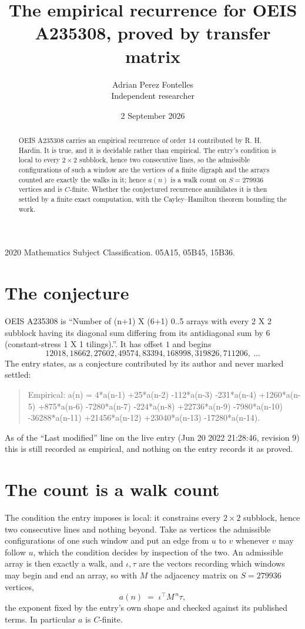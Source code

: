 \documentclass[11pt,a4paper]{article}
\title{The empirical recurrence for OEIS A235308, proved by transfer matrix}
\author{Adrian Perez Fontelles\\ \small Independent researcher}
\date{2 September 2026}
\theoremstyle{plain}
\theoremstyle{definition}
\begin{document}
\maketitle

\begin{abstract}
OEIS A235308 carries an empirical recurrence of order $14$ contributed by R. H. Hardin. It is
true, and it is decidable rather than empirical. The entry's condition is local to every $2\times2$ subblock, hence two consecutive lines, so
the admissible configurations of such a window are the vertices of a finite digraph and the
arrays counted are exactly the walks in it; hence $a(n)$ is a walk count on $S=279936$ vertices
and is $C$-finite. Whether the conjectured recurrence annihilates it is then settled by a
finite exact computation, with the Cayley--Hamilton theorem bounding the work.
\end{abstract}

\noindent\small 2020 Mathematics Subject Classification. 05A15, 05B45, 15B36.\normalsize

\section{The conjecture}

OEIS A235308 is ``Number of (n+1) X (6+1) 0..5 arrays with every 2 X 2 subblock having its diagonal sum differing from its antidiagonal sum by 6 (constant-stress 1 X 1 tilings).''. It has offset $1$ and begins
\[
12018, 18662, 27602, 49574, 83394, 168998, 319826, 711206,\ \dots
\]
The entry states, as a conjecture contributed by its author and never marked settled:
\begin{quote}
Empirical: a(n) = 4*a(n-1) +25*a(n-2) -112*a(n-3) -231*a(n-4) +1260*a(n-5) +875*a(n-6) -7280*a(n-7) -224*a(n-8) +22736*a(n-9) -7980*a(n-10) -36288*a(n-11) +21456*a(n-12) +23040*a(n-13) -17280*a(n-14).
\end{quote}
As of the ``Last modified'' line on the live entry (Jun 20 2022 21:28:46, revision 9) this is still
recorded as empirical, and nothing on the entry records it as proved.

\section{The count is a walk count}

The condition the entry imposes is local: it constrains every $2\times2$ subblock, hence two consecutive lines and nothing beyond. Take as vertices the admissible configurations of one such window and put an edge from $u$ to $v$ whenever $v$ may follow $u$, which the condition decides by inspection of the two.
An admissible array is then exactly a walk, and $\iota,\tau$ are the vectors recording which windows may begin and end an array, so with $M$ the adjacency matrix on $S=279936$ vertices,
\[
a(n)\;=\;\iota^{\!\top}M^{\,n}\tau ,
\]
the exponent fixed by the entry's own shape and checked against its published terms. In
particular $a$ is $C$-finite.
\end{document}
